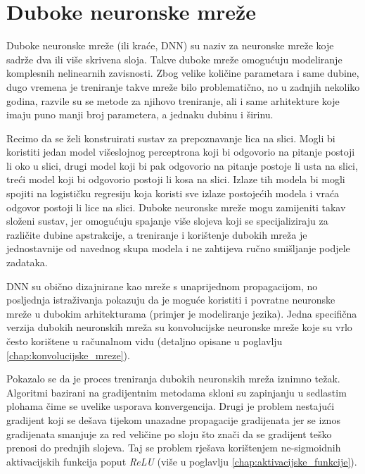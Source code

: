 \documentclass[times, utf8, diplomski, numeric]{fer}
\begin{document}
\section{Duboke neuronske mreže}

Duboke neuronske mreže (ili kraće, DNN) su naziv za neuronske mreže koje sadrže dva ili više skrivena sloja. Takve duboke mreže omogućuju modeliranje komplesnih nelinearnih zavisnosti. Zbog velike količine parametara i same dubine, dugo vremena je treniranje takve mreže bilo problematično, no u zadnjih nekoliko godina, razvile su se metode za njihovo treniranje, ali i same arhitekture koje imaju puno manji broj parametera, a jednaku dubinu i širinu.

Recimo da se želi konstruirati sustav za prepoznavanje lica na slici. Mogli bi koristiti jedan model višeslojnog perceptrona koji bi odgovorio na pitanje postoji li oko u slici, drugi model koji bi pak odgovorio na pitanje postoje li usta na slici, treći model koji bi odgovorio postoji li kosa na slici. Izlaze tih modela bi mogli spojiti na logističku regresiju koja koristi sve izlaze postojećih modela i vraća odgovor postoji li lice na slici. Duboke neuronske mreže mogu zamijeniti takav složeni sustav, jer omogućuju spajanje više slojeva koji se specijaliziraju za različite dubine apstrakcije, a treniranje i korištenje dubokih mreža je jednostavnije od navednog skupa modela i ne zahtijeva ručno smišljanje podjele zadataka.

DNN su obično dizajnirane kao mreže s unaprijednom propagacijom, no posljednja istraživanja pokazuju da je moguće koristiti i povratne neuronske mreže   u dubokim arhitekturama (primjer je modeliranje jezika). Jedna specifična verzija dubokih neuronskih mreža su konvolucijske neuronske mreže koje su vrlo često korištene u računalnom vidu (detaljno opisane u poglavlju \ref{chap:konvolucijske_mreze}).

Pokazalo se da je proces treniranja dubokih neuronskih mreža iznimno težak. Algoritmi bazirani na gradijentnim metodama skloni su zapinjanju u sedlastim plohama čime se uvelike usporava konvergencija. Drugi je problem nestajući gradijent  koji se dešava tijekom unazadne propagacije gradijenata jer se iznos gradijenata smanjuje za red veličine po sloju što znači da se gradijent teško prenosi do prednjih slojeva. Taj se problem rješava korištenjem ne-sigmoidnih aktivacijskih funkcija poput \textit{ReLU} (više u poglavlju \ref{chap:aktivacijske_funkcije}).
\end{document}
